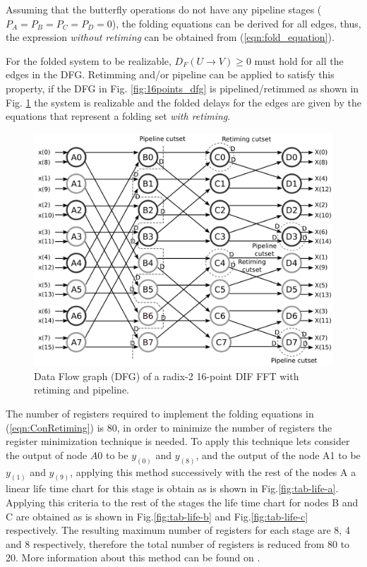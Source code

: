\documentclass[10pt,times,mathptm,psfig,final,journal,comsoc]{IEEEtran}
\begin{document}
Assuming that the butterfly operations do not have any pipeline stages ($P_A=P_B=P_C=P_D=0$), the folding equations can be derived for all edges,
thus, the expression \textit{without retiming} can be obtained from (\ref{eqn:fold_equation}).

\begin{small}

\end{small}
For the folded system to be realizable, $D_F(U\to V)\geq0$ must hold for all the edges in the DFG. Retimming and/or pipeline can be applied to satisfy this property, if the DFG in Fig. \ref{fig:16points_dfg} is pipelined/retimmed as shown in Fig. \ref{fig:dfg_16_ret} the system is realizable and the folded delays for the edges are given by the equations that represent a folding set \textit{with retiming}.

\begin{figure} 
\centering
\includegraphics[width=\linewidth]{Diagramas/16points_dfg_ret.png}
\caption{Data Flow graph (DFG) of a radix-2 16-point DIF FFT with retiming and pipeline.}
\label{fig:dfg_16_ret}
\end{figure}
\begin{small}

\end{small}

The number of registers required to implement the folding equations in (\ref{eqn:ConRetiming}) is 80, in order to minimize the number of registers  the register minimization technique is needed. To apply this technique lets consider
the output of node $A0$ to be $y_{(0)}$ and $y_{(8)}$, and the output of the node A1 to be $y_{(1)}$ and $y_{(9)}$, applying this method successively with the rest of the nodes A a linear life time chart for this stage is obtain as is shown in Fig.\ref{fig:tab-life-a}. Applying this criteria to the rest of the stages the life time chart for nodes B and C are obtained as is shown in Fig.\ref{fig:tab-life-b} and Fig.\ref{fig:tab-life-c}  respectively. The resulting maximum number of registers for each stage are 8, 4 and 8 respectively, therefore the total number of registers is reduced from 80 to 20. More information about this method can be found on \cite{folding_parhi_book}.
\end{document}
